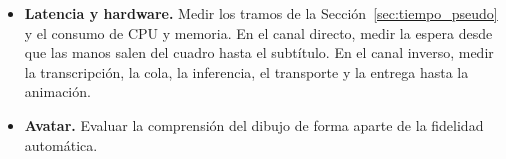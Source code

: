 \begin{itemize}
\begin{itemize}
        \item \textbf{Latencia y hardware.} Medir los tramos de la Sección~\ref{sec:tiempo_pseudo} y el consumo de CPU y memoria. En el canal directo, medir la espera desde que las manos salen del cuadro hasta el subtítulo. En el canal inverso, medir la transcripción, la cola, la inferencia, el transporte y la entrega hasta la animación.
        \item \textbf{Avatar.} Evaluar la comprensión del dibujo de forma aparte de la fidelidad automática.
    \end{itemize}
\end{itemize}